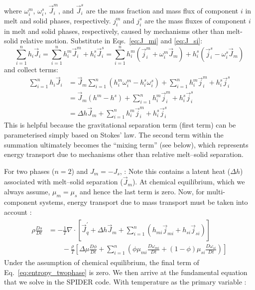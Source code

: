 where $\omega_i^m$, $\omega_i^s$, $\vec{J}_i^m$, and $\vec{J}_i^s$ are the mass fraction and mass flux of component $i$ in melt and solid phases, respectively.  $j_i^m$ and $j_i^s$ are the mass fluxes of component $i$ in melt and solid phases, respectively, caused by mechanisms other than melt-solid relative motion.  Substitute in Eqs.~\ref{eq:J_mi} and \ref{eq:J_si}:
\begin{equation}
\sum_{i=1}^n h_i\vec{J}_i = \sum_{i=1}^n h_i^m \vec{J}_i^m + h_i^s \vec{J}_i^s =  \sum_{i=1}^n h_i^m \left( \vec{j}_i^m + \omega_i^m \vec{J}_m \right) + h_i^s \left( \vec{j}_i^s - \omega_i^s \vec{J}_m \right)
\end{equation}
and collect terms:
\begin{align}
\sum_{i=1}^n h_i\vec{J}_i &= \vec{J}_m \sum_{i=1}^n \left( h_i^m \omega_i^m - h_i^s \omega_i^s \right) + \sum_{i=1}^n h_i^m \vec{j}_i^m + h_i^s \vec{j}_i^s\\
&= \vec{J}_m \left( h^m - h^s \right) + \sum_{i=1}^n h_i^m \vec{j}_i^m + h_i^s \vec{j}_i^s\\
&= \Delta h \vec{J}_m + \sum_{i=1}^n h_i^m \vec{j}_i^m + h_i^s \vec{j}_i^s
\end{align}
This is helpful because the gravitational separation term (first term) can be parameterised simply based on Stokes' law.  The second term within the summation ultimately becomes the ``mixing term'' (see below), which represents energy transport due to mechanisms other than relative melt--solid separation.

For two phases ($n=2$) and $J_m=-J_s$, :
Note this contains a latent heat ($\Delta h$) associated with melt--solid separation ($\vec{J}_m$).  At chemical equilibrium, which we always assume, $\mu_m=\mu_s$ and hence the last term is zero.  Now, for multi-component systems, energy transport due to mass transport must be taken into account :
\begin{align}
\begin{split}
\rho \frac{Ds}{Dt} &= -\frac{1}{T} \nabla \cdot \left[ \vec{J}_q^\prime + \Delta h \vec{J}_m + \sum_{i=1}^n (h_{mi} \vec{j}_{mi} + h_{si} \vec{j}_{si} ) \right]\\
&\qquad -\frac{\rho}{T} \left[ \Delta \mu \frac{D\phi}{Dt} + \sum_{i=1}^n \left( \phi \mu_{mi}\frac{D\omega_{mi}}{Dt} + (1-\phi) \mu_{si} \frac{D\omega_{si}}{Dt} \right) \right]
\end{split}
\end{align}
Under the assumption of chemical equilibrium, the final term of Eq.~\ref{eq:entropy_twophase} is zero.  We then arrive at the fundamental equation that we solve in the SPIDER code.
With temperature as the primary variable :

